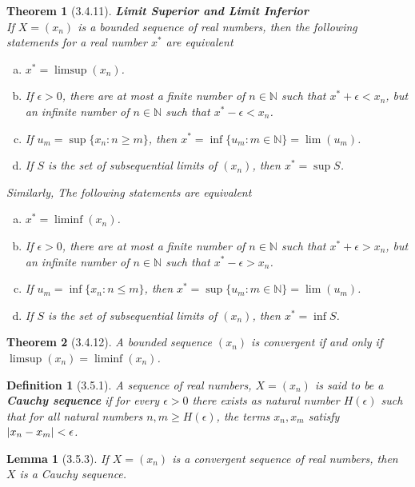 \documentclass{article}
\newtheorem*{theorem}{Theorem}
\newtheorem*{definition}{Definition}
\newtheorem*{lemma}{Lemma}
\DeclarePairedDelimiter\abs{\lvert}{\rvert}%
\begin{document}
\begin{theorem}[3.4.11] \textbf{Limit Superior and Limit Inferior}\\
  
  If $X=(x_n)$ is a bounded sequence of real numbers, then the following 
  statements for a real number $x^*$ are equivalent
  \begin{enumerate}[(a)]
    \item $x^*=\limsup(x_n)$.
    \item If $\epsilon>0$, there are at most a finite number of $n \in{\mathbb{N}}$ such that
      $x^*+\epsilon<x_n$, but an infinite number of $n \in{\mathbb{N}}$ such that
      $x^*-\epsilon<x_n$.
    \item If $u_m=\sup\{x_n:n\ge{m}\}$, then $x^*=\inf\{u_m:m \in{\mathbb{N}}\}=\lim(u_m)$.
    \item If $S$ is the set of subsequential limits of $(x_n)$, then $x^*=\sup{S}$.
  \end{enumerate}

  Similarly, The following statements are equivalent
  \begin{enumerate}[(a)]
    \item $x^*=\liminf(x_n)$.
    \item If $\epsilon>0$, there are at most a finite number of $n \in{\mathbb{N}}$ such that
      $x^*+\epsilon>x_n$, but an infinite number of $n \in{\mathbb{N}}$ such that
      $x^*-\epsilon>x_n$.
    \item If $u_m=\inf\{x_n:n\le{m}\}$, then $x^*=\sup\{u_m:m \in{\mathbb{N}}\}=\lim(u_m)$.
    \item If $S$ is the set of subsequential limits of $(x_n)$, then $x^*=\inf{S}$.
  \end{enumerate}
\end{theorem}

\begin{theorem}[3.4.12] A bounded sequence $(x_n)$ is convergent if and only if
  $\limsup(x_n)=\liminf(x_n)$.
\end{theorem}

\begin{definition}[3.5.1] A sequence of real numbers, $X=(x_n)$ is said to be a \textbf{Cauchy sequence}
  if for every $\epsilon>0$ there exists as natural number $H(\epsilon)$ such that for all natural
  numbers $n,m\ge{H(\epsilon)}$, the terms $x_n,x_m$ satisfy $\abs{x_n-x_m}<\epsilon$.
\end{definition}

\begin{lemma}[3.5.3] If $X=(x_n)$ is a convergent sequence of real numbers, then $X$ is a Cauchy
  sequence.
\end{lemma}
\end{document}
